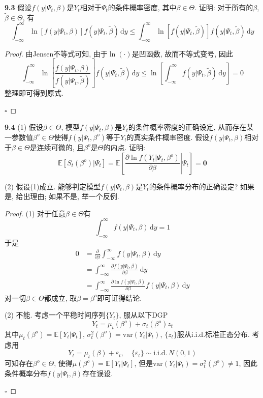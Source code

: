 \documentclass[cn,12pt,math=mtpro2,citestyle=gb7714-2015,bibstyle=gb7714-2015,twocol,mode=simple]{elegantbook}
\newcommand{\E}{\mathbb{E}}
\newcommand{\var}{\text{var}}
\newcommand{\tbeta}{\tilde{\beta}}
\begin{document}
\textbf{9.3} 假设$f(y|\Psi_t,\beta)$是$Y_t$相对于$\Psi_t$的条件概率密度, 其中$\beta\in\Theta$. 证明: 对于所有的$\beta$, $\tilde{\beta}\in\Theta$, 有
$$\int_{-\infty}^{\infty}\ln[f(y|\Psi_t,\beta)]f(y|\Psi_t,\tbeta)\,\text{d}y\leq\int_{-\infty}^{\infty}\ln[f(y|\Psi_t,\tbeta)]f(y|\Psi_t,\tbeta)\,\text{d}y$$
\begin{proof}
  由Jensen不等式可知, 由于$\ln(\cdot)$是凹函数, 故而不等式变号, 因此
  $$\int_{-\infty}^{\infty}\ln\left[\frac{f(y|\Psi_t,\beta)}{f(y|\Psi_t,\tbeta)}\right]f(y|\Psi_t,\tbeta)\,\text{d}y\leq\ln\left[\int_{-\infty}^{\infty}f(y|\Psi_t,\tbeta)\,\text{d}y\right]=0$$
  整理即可得到原式.

  $\square$
\end{proof}
\textbf{9.4} (1) 假设$\beta\in\Theta$, 模型$f(y|\Psi_t,\beta)$是$Y_t$的条件概率密度的正确设定, 从而存在某一参数值$\beta^o\in\Theta$使得$f(y|\Psi_t,\beta^o)$等于$Y_t$的真实条件概率密度. 假设$f(y|\Psi_t,\beta)$相对于$\beta\in\Theta$是连续可微的, 且$\beta^o$是$\Theta$的内点. 证明:
$$\E[S_t(\beta^o)|\Psi_t]=\E\left[\left.\frac{\partial\ln f(Y_t|\Psi_t,\beta^o)}{\partial\beta}\right|\Psi_t\right]=\mathbf{0}$$

(2) 假设(1)成立. 能够判定模型$f(y|\Psi_t,\beta)$是$Y_t$的条件概率分布的正确设定? 如果是, 给出理由; 如果不是, 举一个反例.


\begin{proof}
  (1) 对于任意$\beta\in\Theta$有
  $$\int_{-\infty}^{\infty}f(y|\Psi_t,\beta)\,\text{d}y=1$$
  于是
  \begin{align*}
  0&=\frac{\partial}{\partial\beta}\int_{-\infty}^{\infty}f(y|\Psi_t,\beta)\,\text{d}y \\
  &=\int_{-\infty}^{\infty}\frac{\partial f(y|\Psi_t,\beta)}{\partial\beta}\,\text{d}y \\
  &=\int_{-\infty}^{\infty}\frac{\partial\ln f(y|\Psi_t,\beta)}{\partial\beta}f(y|\Psi_t,\beta)\,\text{d}y
  \end{align*}
  对一切$\beta\in\Theta$都成立, 取$\beta=\beta^o$即可证得结论.

  (2) 不能. 考虑一个平稳时间序列$\{Y_t\}$, 服从以下DGP
  $$Y_t=\mu_t(\beta^o)+\sigma_t(\beta^o)z_t$$
  其中$\mu_t(\beta^o)=\E[Y_t|\Psi_t]$, $\sigma_t^2(\beta^o)=\var(Y_t|\Psi_t)$, $\{z_t\}$服从i.i.d.标准正态分布. 考虑用
  $$Y_t=\mu_t(\beta)+\varepsilon_t,\quad\{\varepsilon_t\}\sim\text{i.i.d.}\,N(0,1)$$
  可知存在$\beta^o\in\Theta$, 使得$\mu(\beta^o)=\E[Y_t|\Psi_t]$, 但是$\var(Y_t|\Psi_t)=\sigma_t^2(\beta^o)\neq1$, 因此条件概率分布$f(y|\Psi_t,\beta)$存在误设.

  $\square$
\end{proof}
\end{document}

